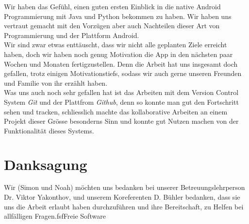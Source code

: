 \documentclass[a4paper,11pt]{article}
\begin{document}
Wir haben das Gefühl, einen guten ersten Einblick in die native Android Programmierung mit Java und Python bekommen zu haben. Wir haben uns vertraut gemacht mit den Vorzügen aber auch Nachteilen dieser Art von Programmierung und der Plattform Android.\\

Wir sind zwar etwas enttäuscht, dass wir nicht alle geplanten Ziele erreicht haben, doch wir haben noch genug Motivation die App in den nächsten paar Wochen und Monaten fertigzustellen. Denn die Arbeit hat uns insgesamt doch gefallen, trotz einigen Motivationstiefs, sodass wir auch gerne unseren Freunden und Familie von ihr erzählt haben.\\

Was uns auch noch sehr gefallen hat ist das Arbeiten mit dem Version Control System \textit{Git} und der Plattfrom \textit{Github}, denn so konnte man gut den Fortschritt sehen und tracken, schliesslich machte das kollaborative Arbeiten an einem Projekt dieser Grösse besonderns Sinn und konnte gut Nutzen machen von der Funktionalität dieses Systems.

\section{Danksagung}
Wir (Simon und Noah) möchten uns bedanken bei unserer Betreuungslehrperson Dr. Viktor Yakonthov, und unserem Koreferenten D. Bühler bedanken, dass sie uns die Arbeit erlaubt haben durchzuführen und ihre Bereitschaft, zu Helfen bei allfälligen Fragen.\gls{fsf}\gls{Freie Software}


\clearpage




\printglossary
\newpage
\printbibliography
\end{document}
